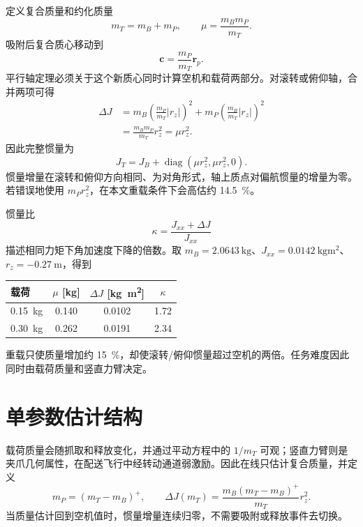 \documentclass[11pt,UTF8,fontset=none]{ctexrep}
\providecommand{\dJ}{\Delta J}
\providecommand{\mB}{m_B}
\providecommand{\mP}{m_P}
\providecommand{\mT}{m_T}
\providecommand{\Jb}{J_B}
\providecommand{\Jt}{J_T}
\providecommand{\rp}{\bm{r}_p}
\providecommand{\rc}{\bm{c}}
\begin{document}
定义复合质量和约化质量
\begin{equation}
\mT=\mB+\mP,\qquad
\mu=\frac{\mB\mP}{\mT}.
\end{equation}
吸附后复合质心移动到
\begin{equation}
\rc=\frac{\mP}{\mT}\rp.
\end{equation}
平行轴定理必须关于这个新质心同时计算空机和载荷两部分。对滚转或俯仰轴，合并两项可得
\begin{align}
\dJ&=\mB\left(\frac{\mP}{\mT}|r_z|\right)^2
    +\mP\left(\frac{\mB}{\mT}|r_z|\right)^2\nonumber\\
&=\frac{\mB\mP}{\mT}r_z^2=\mu r_z^2.
\end{align}
因此完整惯量为
\begin{equation}
\Jt=\Jb+\operatorname{diag}(\mu r_z^2,\mu r_z^2,0).
\end{equation}
惯量增量在滚转和俯仰方向相同、为对角形式，轴上质点对偏航惯量的增量为零。若错误地使用 $\mP r_z^2$，在本文重载条件下会高估约 \SI{14.5}{\percent}。

惯量比
\begin{equation}
\kappa=\frac{J_{xx}+\dJ}{J_{xx}}
\end{equation}
描述相同力矩下角加速度下降的倍数。取 $\mB=\SI{2.0643}{\kg}$、$J_{xx}=\SI{0.0142}{\kg\meter\squared}$、$r_z=\SI{-0.27}{\meter}$，得到
\begin{center}
\begin{tabular}{lccc}
\toprule
载荷 & $\mu$ [kg] & $\dJ$ [\si{\kg\meter\squared}] & $\kappa$\\
\midrule
\SI{0.15}{\kg} & 0.140 & 0.0102 & 1.72\\
\SI{0.30}{\kg} & 0.262 & 0.0191 & 2.34\\
\bottomrule
\end{tabular}
\end{center}
重载只使质量增加约 \SI{15}{\percent}，却使滚转/俯仰惯量超过空机的两倍。任务难度因此同时由载荷质量和竖直力臂决定。

\section{单参数估计结构}

载荷质量会随抓取和释放变化，并通过平动方程中的 $1/\mT$ 可观；竖直力臂则是夹爪几何属性，在配送飞行中经转动通道弱激励。因此在线只估计复合质量，并定义
\begin{equation}
\mP=(\mT-\mB)^+,
\qquad
\boxed{\dJ(\mT)=\frac{\mB(\mT-\mB)^+}{\mT}r_z^2}.
\end{equation}
当质量估计回到空机值时，惯量增量连续归零，不需要吸附或释放事件去切换。
\end{document}
